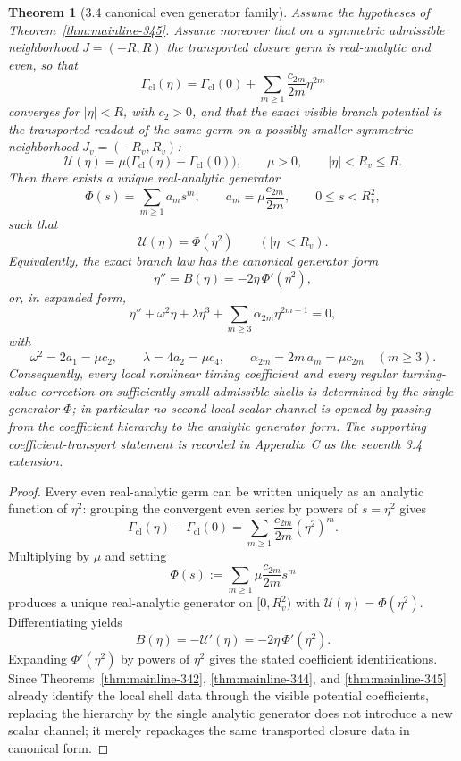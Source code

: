 \documentclass[12pt,a4paper]{article}
\newtheorem{theorem}{Theorem}[section]
\begin{document}
\begin{theorem}[3.4 canonical even generator family]
\label{thm:mainline-346}
Assume the hypotheses of Theorem~\ref{thm:mainline-345}. Assume moreover that on a symmetric admissible neighborhood $J=(-R,R)$ the transported closure germ is real-analytic and even, so that
\[
 \Gamma_{\mathrm{cl}}(\eta)
 =\Gamma_{\mathrm{cl}}(0)+\sum_{m\ge 1}\frac{c_{2m}}{2m}\eta^{2m}
\]
converges for $|\eta|<R$, with $c_2>0$, and that the exact visible branch potential is the transported readout of the same germ on a possibly smaller symmetric neighborhood $J_v=(-R_v,R_v)$:
\[
 \mathcal U(\eta)=\mu\bigl(\Gamma_{\mathrm{cl}}(\eta)-\Gamma_{\mathrm{cl}}(0)\bigr),
 \qquad \mu>0,
 \qquad |\eta|<R_v\le R.
\]
Then there exists a unique real-analytic generator
\[
 \Phi(s)=\sum_{m\ge 1} a_m s^m,
 \qquad a_m=\mu\frac{c_{2m}}{2m},
 \qquad 0\le s<R_v^2,
\]
such that
\[
 \mathcal U(\eta)=\Phi(\eta^2)
 \qquad (|\eta|<R_v).
\]
Equivalently, the exact branch law has the canonical generator form
\[
 \eta'' = B(\eta) = -2\eta\,\Phi'(\eta^2),
\]
or, in expanded form,
\[
 \eta'' + \omega^2\eta + \lambda\eta^3 + \sum_{m\ge 3}\alpha_{2m}\eta^{2m-1}=0,
\]
with
\[
 \omega^2=2a_1=\mu c_2,
 \qquad
 \lambda=4a_2=\mu c_4,
 \qquad
 \alpha_{2m}=2m\,a_m=\mu c_{2m}\quad (m\ge 3).
\]
Consequently, every local nonlinear timing coefficient and every regular turning-value correction on sufficiently small admissible shells is determined by the single generator $\Phi$; in particular no second local scalar channel is opened by passing from the coefficient hierarchy to the analytic generator form.
The supporting coefficient-transport statement is recorded in Appendix~C as the seventh 3.4 extension.
\end{theorem}

\begin{proof}
Every even real-analytic germ can be written uniquely as an analytic function of $\eta^2$: grouping the convergent even series by powers of $s=\eta^2$ gives
\[
 \Gamma_{\mathrm{cl}}(\eta)-\Gamma_{\mathrm{cl}}(0)
 =\sum_{m\ge 1}\frac{c_{2m}}{2m}(\eta^2)^m.
\]
Multiplying by $\mu$ and setting
\[
 \Phi(s):=\sum_{m\ge 1}\mu\frac{c_{2m}}{2m}s^m
\]
produces a unique real-analytic generator on $[0,R_v^2)$ with $\mathcal U(\eta)=\Phi(\eta^2)$. Differentiating yields
\[
 B(\eta)=-\mathcal U'(\eta)=-2\eta\,\Phi'(\eta^2).
\]
Expanding $\Phi'(\eta^2)$ by powers of $\eta^2$ gives the stated coefficient identifications. Since Theorems~\ref{thm:mainline-342}, \ref{thm:mainline-344}, and \ref{thm:mainline-345} already identify the local shell data through the visible potential coefficients, replacing the hierarchy by the single analytic generator does not introduce a new scalar channel; it merely repackages the same transported closure data in canonical form.
\end{proof}
\end{document}
